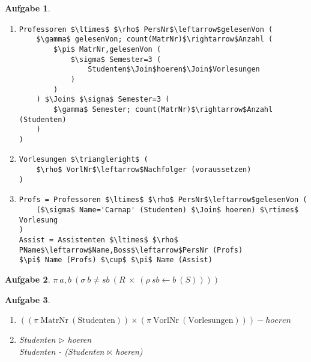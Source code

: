 \documentclass[11pt]{article}
\theoremstyle{break}
\newtheorem{task}{Aufgabe}
\begin{document}
\begin{task}
    \hfill\vspace{-5mm}
    \begin{enumerate}[label={(\alph*)}]
        \item \begin{lstlisting}[mathescape=true]
Professoren $\ltimes$ $\rho$ PersNr$\leftarrow$gelesenVon (
    $\gamma$ gelesenVon; count(MatrNr)$\rightarrow$Anzahl (
        $\pi$ MatrNr,gelesenVon (
            $\sigma$ Semester=3 (
                Studenten$\Join$hoeren$\Join$Vorlesungen
            )
        )
    ) $\Join$ $\sigma$ Semester=3 (
        $\gamma$ Semester; count(MatrNr)$\rightarrow$Anzahl (Studenten)
    )
)
        \end{lstlisting}

        \item \begin{lstlisting}[mathescape=true]
Vorlesungen $\triangleright$ (
    $\rho$ VorlNr$\leftarrow$Nachfolger (voraussetzen)
)
        \end{lstlisting}
        
        \item \begin{lstlisting}[mathescape=true]
Profs = Professoren $\ltimes$ $\rho$ PersNr$\leftarrow$gelesenVon (
    ($\sigma$ Name='Carnap' (Studenten) $\Join$ hoeren) $\rtimes$ Vorlesung
)
Assist = Assistenten $\ltimes$ $\rho$ PName$\leftarrow$Name,Boss$\leftarrow$PersNr (Profs)
$\pi$ Name (Profs) $\cup$ $\pi$ Name (Assist)
        \end{lstlisting}
    \end{enumerate}
\end{task}

\begin{task}
    $\pi\ a,b\ (\sigma\ b\neq sb\ (R\ \times\ (\rho\ sb\leftarrow b\ (S))))$
\end{task}

\begin{task}
    \hfill\vspace{-5mm}
    \begin{enumerate}[label={(\alph*)}]
        \item $((\pi\ \text{MatrNr}\ (\text{Studenten}))\times (\pi\ \text{VorlNr}\ (\text{Vorlesungen}))) - hoeren$
        \item Studenten $\triangleright$ hoeren\\
        Studenten - (Studenten $\ltimes$ hoeren)
    \end{enumerate}
\end{task}
\end{document}
